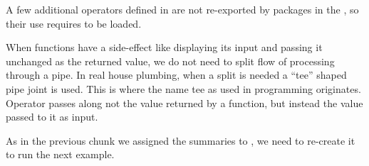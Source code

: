 \documentclass[krantz2,ChapterTOCs]{krantz}\usepackage{knitr}
\begin{document}
A few additional operators defined in  are not re-exported by packages in the , so their use requires  to be loaded.

When functions have a side-effect like  displaying its input and passing it unchanged as the returned value, we do not need to split flow of processing through a pipe. In real house plumbing, when a split is needed a ``tee'' shaped pipe joint is used. This is where the name tee as used in programming originates. Operator  passes along not the value returned by a function, but instead the value passed to it as input.

As in the previous chunk we assigned the summaries to , we need to re-create it to run the next example.

\begin{knitrout}\footnotesize
{}\color{fgcolor}\begin{kframe}
\begin{alltt}
 \hlkwb{<-} \hlstd{(} \hlstd{=} \hlopt{:}\hlstd{,}  \hlstd{=} \hlstd{(letters[}\hlopt{:}\hlstd{],} \hlstd{))}
\end{alltt}
\end{kframe}
\end{knitrout}

\begin{knitrout}\footnotesize
{}\color{fgcolor}
\end{knitrout}
\end{document}
